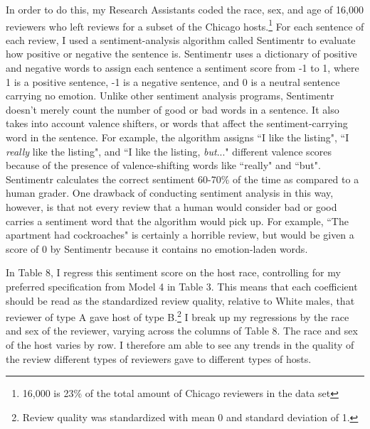 \documentclass[11pt, oneside]{article}
\begin{document}
In order to do this, my Research Assistants coded the race, sex, and age of 16,000 reviewers who left reviews for a subset of the Chicago hosts.\footnote{16,000 is 23\% of the total amount of Chicago reviewers in the data set} For each sentence of each review, I used a sentiment-analysis algorithm called Sentimentr to evaluate how positive or negative the sentence is. Sentimentr uses a dictionary of positive and negative words to assign each sentence a sentiment score from -1 to 1, where 1 is a positive sentence, -1 is a negative sentence, and 0 is a neutral sentence carrying no emotion. Unlike other sentiment analysis programs, Sentimentr doesn't merely count the number of good or bad words in a sentence. It also takes into account valence shifters, or words that affect the sentiment-carrying word in the sentence. For example, the algorithm assigns ``I like the listing", ``I \textit{really} like the listing", and ``I like the listing, \textit{but}..." different valence scores because of the presence of valence-shifting words like ``really" and ``but". Sentimentr calculates the correct sentiment 60-70\% of the time as compared to a human grader. One drawback of conducting sentiment analysis in this way, however, is that not every review that a human would consider bad or good carries a sentiment word that the algorithm would pick up. For example, ``The apartment had cockroaches" is certainly a horrible review, but would be given a score of 0 by Sentimentr because it contains no emotion-laden words. 

In Table 8, I regress this sentiment score on the host race, controlling for my preferred specification from Model 4 in Table 3. This means that each coefficient should be read as the standardized review quality, relative to White males, that reviewer of type A gave host of type B.\footnote{Review quality was standardized with mean 0 and standard deviation of 1.} I break up my regressions by the race and sex of the reviewer, varying across the columns of Table 8. The race and sex of the host varies by row. I therefore am able to see any trends in the quality of the review different types of reviewers gave to different types of hosts. 
\end{document}
